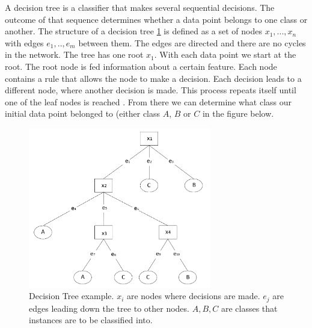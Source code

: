 A decision tree is a classifier that makes several sequential decisions. The outcome of that sequence determines whether a data point belongs to one class or another. The structure of a decision tree \ref{fig:DT} is defined as a set of nodes ${x_1, ... , x_n}$ with edges ${e_1, .., e_{m}}$ between them. The edges are directed and there are no cycles in the network. The tree has one root $x_1$. With each data point we start at the root. The root node is fed information about a certain feature. Each node contains a rule that allows the node to make a decision. Each decision leads to a different node, where another decision is made. This process repeats itself until one of the leaf nodes is reached \cite{safavian1991survey}. From there we can determine what class our initial data point belonged to (either class $A$, $B$ or $C$ in the figure below. 
\begin{figure}[H]
    \includegraphics[width=80mm]{./img/decisiontree.png}
    \caption{Decision Tree example. $x_i$ are nodes where decisions are made. $e_j$ are edges leading down the tree to other nodes. $A,B,C$ are classes that instances are to be classified into.}
    \label{fig:DT}
\end{figure}

